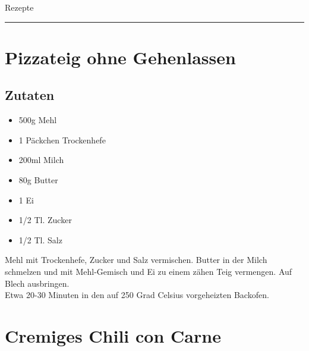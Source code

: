 \documentclass{article}
\begin{document}
{\Huge Rezepte}
\vspace{1cm}
\hrule
\vspace{1cm}
\tableofcontents
\newpage

\section{Pizzateig ohne Gehenlassen}
	\subsection*{Zutaten}
	\begin{itemize}
	  \item 500g Mehl
	  \item 1 Päckchen Trockenhefe
	  \item 200ml Milch
	  \item 80g Butter
	  \item 1 Ei
	  \item 1/2 Tl. Zucker
	  \item 1/2 Tl. Salz
	\end{itemize}
	Mehl mit Trockenhefe, Zucker und Salz vermischen.
	Butter in der Milch schmelzen und mit Mehl-Gemisch und Ei zu einem zähen Teig
	vermengen. Auf Blech ausbringen.\\
	Etwa 20-30 Minuten in den auf 250 Grad Celsius vorgeheizten Backofen. 

\section{Cremiges Chili con Carne}
\end{document}
